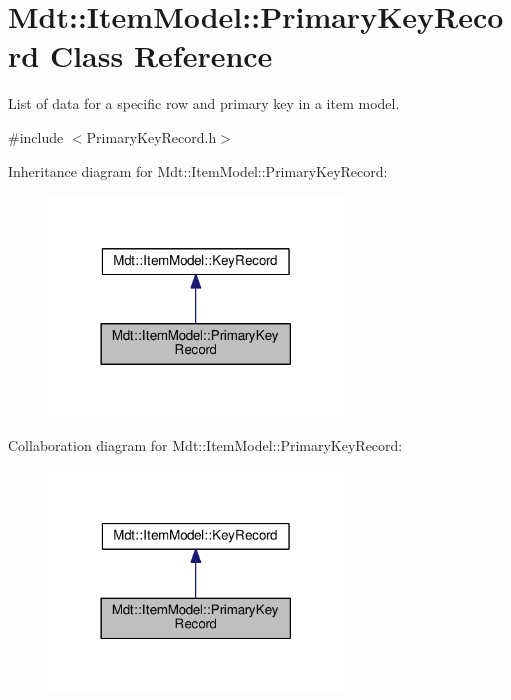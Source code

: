 \hypertarget{class_mdt_1_1_item_model_1_1_primary_key_record}{}\section{Mdt\+:\+:Item\+Model\+:\+:Primary\+Key\+Record Class Reference}
\label{class_mdt_1_1_item_model_1_1_primary_key_record}


List of data for a specific row and primary key in a item model.  




{\ttfamily \#include $<$Primary\+Key\+Record.\+h$>$}



Inheritance diagram for Mdt\+:\+:Item\+Model\+:\+:Primary\+Key\+Record\+:\nopagebreak
\begin{figure}[H]
\begin{center}
\leavevmode
\includegraphics[width=222pt]{class_mdt_1_1_item_model_1_1_primary_key_record__inherit__graph}
\end{center}
\end{figure}


Collaboration diagram for Mdt\+:\+:Item\+Model\+:\+:Primary\+Key\+Record\+:\nopagebreak
\begin{figure}[H]
\begin{center}
\leavevmode
\includegraphics[width=222pt]{class_mdt_1_1_item_model_1_1_primary_key_record__coll__graph}
\end{center}
\end{figure}
